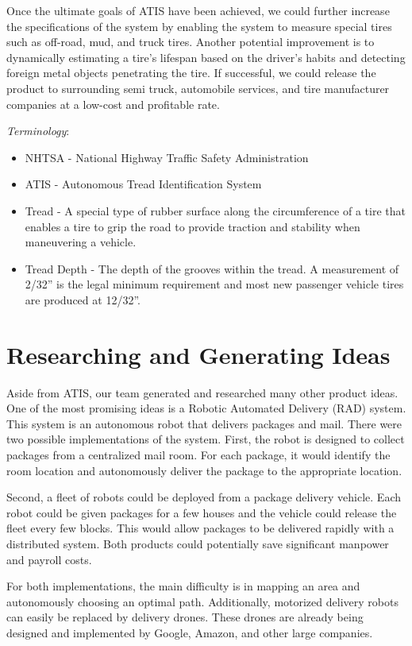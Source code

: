 \documentclass[11pt]{IEEEtran}
\begin{document}
			Once the ultimate goals of ATIS have been achieved, we could further increase the specifications of the system by enabling the system to measure special tires such as off-road, mud, and truck tires. Another potential improvement is to dynamically estimating a tire’s lifespan based on the driver’s habits and detecting foreign metal objects penetrating the tire. If successful, we could release the product to surrounding semi truck, automobile services, and tire manufacturer companies at a low-cost and profitable rate.

		\textit{Terminology}:
		\begin{itemize}
			\item NHTSA - National Highway Traffic Safety Administration
			\item ATIS - Autonomous Tread Identification System
			\item Tread - A special type of rubber surface along the circumference of a tire that enables a tire to grip the road to provide traction and stability when maneuvering a vehicle.
			\item Tread Depth - The depth of the grooves within the tread. A measurement of 2/32'' is the legal minimum requirement and most new passenger vehicle tires are produced at 12/32''.
		\end{itemize}


	\section{Researching and Generating Ideas}
		Aside from ATIS, our team generated and researched many other product ideas. One of the most promising ideas is a Robotic Automated Delivery (RAD) system. This system is an autonomous robot that delivers packages and mail. There were two possible implementations of the system. First, the robot is designed to collect packages from a centralized mail room. For each package, it would identify the room location and autonomously deliver the package to the appropriate location.

		Second, a fleet of robots could be deployed from a package delivery vehicle. Each robot could be given packages for a few houses and the vehicle could release the fleet every few blocks. This would allow packages to be delivered rapidly with a distributed system. Both products could potentially save significant manpower and payroll costs.

		For both implementations, the main difficulty is in mapping an area and autonomously choosing an optimal path. Additionally, motorized delivery robots can easily be replaced by delivery drones. These drones are already being designed and implemented by Google, Amazon, and other large companies. 
\end{document}
